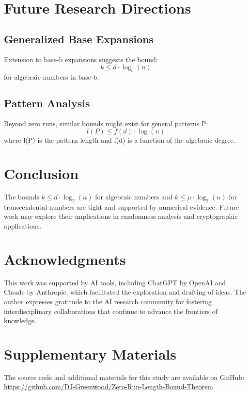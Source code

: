 \section{Future Research Directions}

\subsection{Generalized Base Expansions}
Extension to base-b expansions suggests the bound:
\begin{equation}
    k \leq d \cdot \log_b(n)
\end{equation}
for algebraic numbers in base-b.

\subsection{Pattern Analysis}
Beyond zero runs, similar bounds might exist for general patterns P:
\begin{equation}
    l(P) \leq f(d) \cdot \log(n)
\end{equation}
where l(P) is the pattern length and f(d) is a function of the algebraic degree.

\section{Conclusion}
The bounds $k \leq d \cdot \log_2(n)$ for algebraic numbers and $k \leq \mu \cdot \log_2(n)$ for transcendental
numbers are tight and supported by numerical evidence. Future work may explore their
implications in randomness analysis and cryptographic applications.

\section{Acknowledgments}
This work was supported by AI tools, including ChatGPT by OpenAI and Claude by Anthropic, which facilitated the exploration and drafting of ideas. The author expresses gratitude to the AI research community for fostering interdisciplinary collaborations that continue to advance the frontiers of knowledge. 

\section{Supplementary Materials}
The source code and additional materials for this study are available on \newline GitHub: \url{ 
https://github.com/DJ-Greenwood/Zero-Run-Length-Bound-Theorem}.

